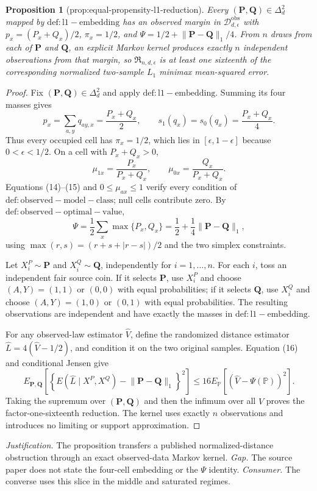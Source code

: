 \documentclass{article}
\newtheorem{proposition}{Proposition}
\begin{document}
\begin{proposition}[prop:equal-propensity-l1-reduction]\label{prop:equal-propensity-l1-reduction}
Every \((\mathbf P,\mathbf Q)\in\Delta_d^2\) mapped by \(\mathrm{def:l1-embedding}\) has an observed margin in \(\mathcal D_{d,\epsilon}^{\mathrm{obs}}\) with \(p_x=(P_x+Q_x)/2\), \(\pi_x=1/2\), and \(\Psi=1/2+\lVert\mathbf P-\mathbf Q\rVert_1/4\).  From \(n\) draws from each of \(\mathbf P\) and \(\mathbf Q\), an explicit Markov kernel produces exactly \(n\) independent observations from that margin, so \(\mathfrak R_{n,d,\epsilon}\) is at least one sixteenth of the corresponding normalized two-sample \(L_1\) minimax mean-squared error.
\end{proposition}
\begin{proof}
Fix \((\mathbf P,\mathbf Q)\in\Delta_d^2\) and apply \(\mathrm{def:l1-embedding}\).  Summing its four masses gives
\[
 p_x=\sum_{a,y}q_{ay,x}=\frac{P_x+Q_x}{2},\qquad
 s_1(q_x)=s_0(q_x)=\frac{P_x+Q_x}{4}.                               \tag{14}
\]
Thus every occupied cell has \(\pi_x=1/2\), which lies in \([\epsilon,1-\epsilon]\) because \(0<\epsilon<1/2\).  On a cell with \(P_x+Q_x>0\),
\[
 \mu_{1x}=\frac{P_x}{P_x+Q_x},\qquad
 \mu_{0x}=\frac{Q_x}{P_x+Q_x}.                                     \tag{15}
\]
Equations (14)--(15) and \(0\leq\mu_{ax}\leq1\) verify every condition of \(\mathrm{def:observed-model-class}\); null cells contribute zero.  By \(\mathrm{def:observed-optimal-value}\),
\[
 \Psi=\frac12\sum_x\max\{P_x,Q_x\}
 =\frac12+\frac14\lVert\mathbf P-\mathbf Q\rVert_1,              \tag{16}
\]
using \(\max(r,s)=(r+s+|r-s|)/2\) and the two simplex constraints.

Let \(X_i^P\sim\mathbf P\) and \(X_i^Q\sim\mathbf Q\), independently for \(i=1,\ldots,n\).  For each \(i\), toss an independent fair source coin.  If it selects \(\mathbf P\), use \(X_i^P\) and choose \((A,Y)=(1,1)\) or \((0,0)\) with equal probabilities; if it selects \(\mathbf Q\), use \(X_i^Q\) and choose \((A,Y)=(1,0)\) or \((0,1)\) with equal probabilities.  The resulting observations are independent and have exactly the masses in \(\mathrm{def:l1-embedding}\).

For any observed-law estimator \(\widehat V\), define the randomized distance estimator \(\widehat L=4(\widehat V-1/2)\), and condition it on the two original samples.  Equation (16) and conditional Jensen give
\[
 E_{\mathbf P,\mathbf Q}\left[
 \left\{E(\widehat L\mid X^P,X^Q)-\lVert\mathbf P-\mathbf Q\rVert_1\right\}^2\right]
 \leq16E_{\mathbb P}\left[(\widehat V-\Psi(\mathbb P))^2\right]. \tag{17}
\]
Taking the supremum over \((\mathbf P,\mathbf Q)\) and then the infimum over all \(\widehat V\) proves the factor-one-sixteenth reduction.  The kernel uses exactly \(n\) observations and introduces no limiting or support approximation.
\end{proof}
\par\smallskip\noindent \textit{Justification.} The proposition transfers a published normalized-distance obstruction through an exact observed-data Markov kernel. \textit{Gap.} The source paper does not state the four-cell embedding or the \(\Psi\) identity. \textit{Consumer.} The converse uses this slice in the middle and saturated regimes.
\end{document}
